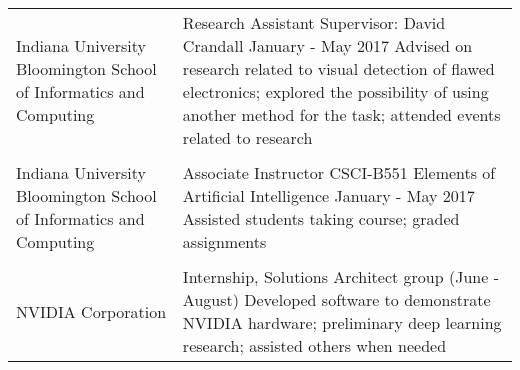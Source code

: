\begin{center}

    \begin{tabular}{p{2.0in} p{4.0in}}

        Indiana University Bloomington
        School of Informatics
        and Computing
                              &
                                  Research Assistant         \newline
                                  Supervisor: David Crandall \newline
                                  January - May 2017 \newline
                                  Advised on research related to visual detection of flawed
                                  electronics; explored the possibility of using another method for
                                  the task; attended events related to research
                               \\

        \vspace{16pt} \\
    
        Indiana University
        Bloomington School
        of Informatics and
        Computing
                             &
                                  Associate Instructor \newline
                                  CSCI-B551 Elements of Artificial Intelligence \newline
                                  January - May 2017 \newline
                                  Assisted students taking course; graded assignments
                               \\
    
        \vspace{16pt} \\

        NVIDIA Corporation
                             &
                                  Internship, Solutions Architect group \newline
                                  2017 (June - August) \newline
                                  Developed software to demonstrate NVIDIA hardware; preliminary
                                  deep learning research; assisted others when needed
                                \\
    \end{tabular}




\end{center}
